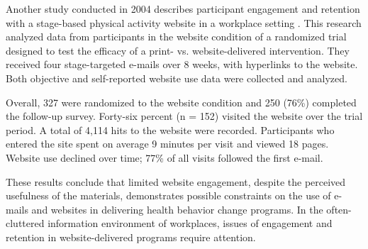 Another study conducted in 2004 describes participant engagement and retention with a stage-based physical activity website in a workplace setting \cite{leslie2005engagement}. This research analyzed data from participants in the website condition of a randomized trial designed to test the efficacy of a print- vs. website-delivered intervention. They received four stage-targeted e-mails over 8 weeks, with hyperlinks to the website. Both objective and self-reported website use data were collected and analyzed.

Overall, 327 were randomized to the website condition and 250 (76\%) completed the follow-up survey. Forty-six percent (n = 152) visited the website over the trial period. A total of 4,114 hits to the website were recorded. Participants who entered the site spent on average 9 minutes per visit and viewed 18 pages. Website use declined over time; 77\% of all visits followed the first e-mail.

These results conclude that limited website engagement, despite the perceived usefulness of the materials, demonstrates possible constraints on the use of e-mails and websites in delivering health behavior change programs. In the often-cluttered information environment of workplaces, issues of engagement and retention in website-delivered programs require attention.